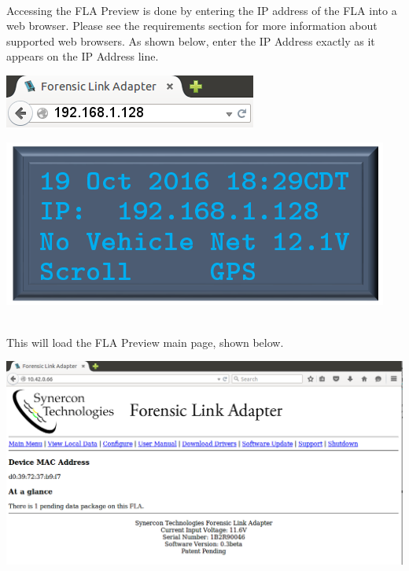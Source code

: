 \documentclass[11pt, oneside]{book}
\begin{document}
\paragraph{  }
Accessing the FLA Preview is done by entering the IP address of the
FLA into a web browser. Please see the requirements section for more
information about supported web browsers. As shown below, enter the
IP Address exactly as it appears on the IP Address line.
\\[\baselineskip]
\noindent\begin{minipage}{0.45\textwidth}%
	\includegraphics[width=\linewidth]{../media/fla_preview_screenshots/url_correct_2} 
\end{minipage}%
\hfill%
\begin{minipage}{0.45\textwidth} 
	\includegraphics[width=\linewidth]{../media/pstricks_files/01_main_screen_1_128_ip}
\end{minipage}
\\[\baselineskip]
This will load the FLA Preview main page, shown below.
\begin{center}
\includegraphics[width=.9\linewidth]{../media/fla_preview_screenshots/main_page}
\end{center}
\end{document}
